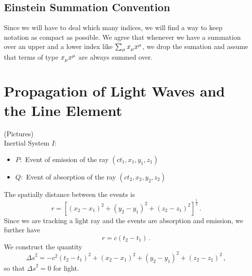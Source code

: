 \subsection{Einstein Summation Convention}
Since we will have to deal which many indices, we will find a way to keep
notation as compact as possible. We agree that whenever we have a summation over an
upper and a lower index like $\sum_\mu \tensor{x}{_\mu}\tensor{x}{^\mu}$, we
drop the sumation and assume that terms of type
$\tensor{x}{_\mu}\tensor{x}{^\mu}$ are always summed over.
\section{Propagation of Light Waves and the Line Element}
(Pictures)\\
Inertial System $I$:
\begin{itemize}
    \item $P:$ Event of emission of the ray $(ct_1,x_1,y_1,z_1)$
    \item $Q:$ Event of absorption of the ray $(ct_2,x_2,y_2,z_2)$
\end{itemize}
The spatially distance between the events is
\begin{equation}
    r=\left[(x_2-x_1)^2+(y_2-y_1)^2+(z_2-z_1)^2\right]^{\frac{1}{2}}\, .
\end{equation}
Since we are tracking a light ray and the events are absorption and emission, we
further have
\begin{equation}
    r=c(t_2-t_1)\, .
\end{equation}
We construct the quantity
\begin{equation}
    {\Delta s}^2=-c^2(t_2-t_1)^2+(x_2-x_1)^2+(y_2-y_1)^2+(z_2-z_1)^2\, ,
\end{equation}
so that ${\Delta s}^2=0$ for light.

